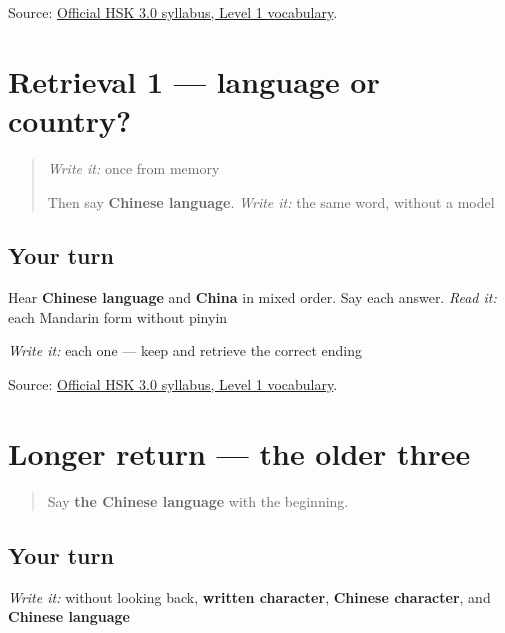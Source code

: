 \begin{tcolorbox}[breakable,colback=teal!4,colframe=teal!35!black,title={Before you move on}]
Source: \href{https://hsk.cn-bj.ufileos.com/3.0/\%E6\%96\%B0\%E7\%89\%88HSK\%E8\%80\%83\%E8\%AF\%95\%E5\%A4\%A7\%E7\%BA\%B21219.pdf}{Official HSK 3.0 syllabus, Level 1 vocabulary}.
\end{tcolorbox}
\section[Practice]{Retrieval 1 — language or country?}

\label{lesson:ZH-R17-country-language-r1}



\begin{quote}
\emph{Write it:}  once from memory

Then say \textbf{Chinese language}. \emph{Write it:} the same word, without a model
\end{quote}

\subsection*{Your turn}
Hear \textbf{Chinese language} and \textbf{China} in mixed order. Say each answer. \emph{Read it:} each Mandarin form without pinyin

\emph{Write it:} each one — keep  and retrieve the correct ending

\begin{tcolorbox}[breakable,colback=teal!4,colframe=teal!35!black,title={Before you move on}]
Source: \href{https://hsk.cn-bj.ufileos.com/3.0/\%E6\%96\%B0\%E7\%89\%88HSK\%E8\%80\%83\%E8\%AF\%95\%E5\%A4\%A7\%E7\%BA\%B21219.pdf}{Official HSK 3.0 syllabus, Level 1 vocabulary}.
\end{tcolorbox}
\section[Practice]{Longer return — the older three}

\label{lesson:ZH-R17-old-three-r2}



\begin{quote}
Say \textbf{the Chinese language} with the  beginning.
\end{quote}

\subsection*{Your turn}
\emph{Write it:} without looking back, \textbf{written character}, \textbf{Chinese character}, and \textbf{Chinese language}


